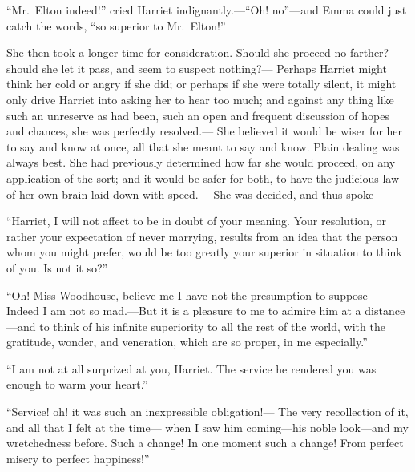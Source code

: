 ``Mr.\ Elton indeed!'' cried Harriet indignantly.---``Oh! no''---and Emma
could just catch the words, ``so superior to Mr.\ Elton!''

She then took a longer time for consideration.  Should she proceed
no farther?---should she let it pass, and seem to suspect nothing?---%
Perhaps Harriet might think her cold or angry if she did;
or perhaps if she were totally silent, it might only drive
Harriet into asking her to hear too much; and against any thing
like such an unreserve as had been, such an open and frequent
discussion of hopes and chances, she was perfectly resolved.---%
She believed it would be wiser for her to say and know at once,
all that she meant to say and know.  Plain dealing was always best.
She had previously determined how far she would proceed,
on any application of the sort; and it would be safer for both,
to have the judicious law of her own brain laid down with speed.---%
She was decided, and thus spoke---%

``Harriet, I will not affect to be in doubt of your meaning.
Your resolution, or rather your expectation of never marrying,
results from an idea that the person whom you might prefer,
would be too greatly your superior in situation to think of you.
Is not it so?''

``Oh!  Miss Woodhouse, believe me I have not the presumption to suppose---%
Indeed I am not so mad.---But it is a pleasure to me to admire him
at a distance---and to think of his infinite superiority to all
the rest of the world, with the gratitude, wonder, and veneration,
which are so proper, in me especially.''

``I am not at all surprized at you, Harriet.  The service he rendered
you was enough to warm your heart.''

``Service! oh! it was such an inexpressible obligation!---%
The very recollection of it, and all that I felt at the time---%
when I saw him coming---his noble look---and my wretchedness before.
Such a change!  In one moment such a change!  From perfect misery
to perfect happiness!''

